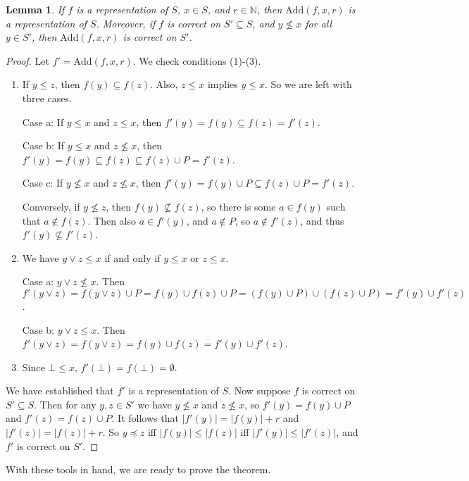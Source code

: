 \documentclass[12pt]{article}
\newcommand{\Add}{\text{Add}}
\newtheorem{lemma}{Lemma}
\begin{document}
\begin{lemma}\label{lem:add}
If $f$ is a representation of $S$, $x\in S$, and $r\in \mathbb{N}$, then $\Add(f,x,r)$ is a representation of $S$. Moreover, if $f$ is correct on $S'\subseteq S$, and $y\not\leq x$ for all $y\in S'$, then $\Add(f,x,r)$ is correct on $S'$. 
\end{lemma}
\begin{proof}
Let $f' = \Add(f,x,r)$. We check conditions (1)-(3). 
\begin{enumerate}[(1)]
    \item If $y\leq z$, then $f(y) \subseteq f(z)$. Also, $z\leq x$ implies $y\leq x$. So we are left with three cases. 
    
    Case a: If $y\leq x$ and $z\leq x$, then $f'(y) = f(y)\subseteq f(z) = f'(z)$. 
    
    Case b: If $y\leq x$ and $z\not\leq x$, then $f'(y) = f(y) \subseteq f(z) \subseteq f(z)\cup P = f'(z)$. 
    
    Case c: If $y\not\leq x$ and $z\not\leq x$, then $f'(y) = f(y)\cup P \subseteq f(z)\cup P = f'(z)$. 
    
    Conversely, if $y\not\leq z$, then $f(y)\not\subseteq f(z)$, so there is some $a\in f(y)$ such that $a\notin f(z)$. Then also $a\in f'(y)$, and $a\notin P$, so $a\notin f'(z)$, and thus $f'(y)\not\subseteq f'(z)$. 
    \item We have $y\vee z \leq x$ if and only if $y\leq x$ or $z\leq x$. 
    
    Case a: $y\vee z \not\leq x$. Then $f'(y\vee z) = f(y\vee z)\cup P = f(y)\cup f(z)\cup P = (f(y)\cup P)\cup (f(z)\cup P) = f'(y)\cup f'(z)$. 
    
    Case b: $y\vee z\leq x$. Then $f'(y\vee z) = f(y\vee z) = f(y)\cup f(z) = f'(y)\cup f'(z)$. 
    
    \item Since $\bot\leq x$, $f'(\bot) = f(\bot) = \emptyset$.
\end{enumerate}

We have established that $f'$ is a representation of $S$. Now suppose $f$ is correct on $S'\subseteq S$. Then for any $y,z\in S'$ we have $y\not\leq x$ and $z\not\leq x$, so $f'(y) = f(y)\cup P$ and $f'(z) = f(z)\cup P$. It follows that $|f'(y)| = |f(y)|+r$ and $|f'(z)| = |f(z)|+r$. So $y\preceq z$ iff $|f(y)|\leq |f(z)|$ iff $|f'(y)|\leq |f'(z)|$, and $f'$ is correct on $S'$. 
\end{proof}

With these tools in hand, we are ready to prove the theorem. 
\end{document}
